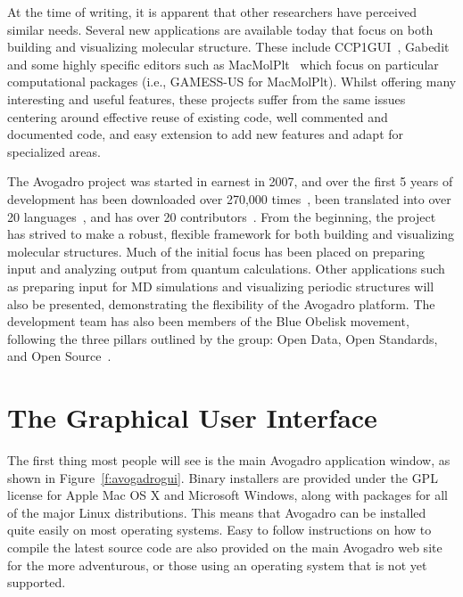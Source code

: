 \documentclass[10pt]{bmc_article}
\newenvironment{bmcformat}{\begin{raggedright}
\baselineskip20pt\sloppy\setboolean{publ}{false}}{\end{raggedright}
\baselineskip20pt\sloppy}
\begin{document}
\begin{bmcformat}
At the time of writing, it is apparent that other researchers have perceived
similar needs. Several new applications are available today that focus on both
building and visualizing molecular structure. These include
CCP1GUI~\cite{CCP1GUI}, Gabedit~\cite{Gabedit} and some highly specific
editors such as MacMolPlt~\cite{MacMolPlt} which focus on particular
computational packages (i.e., GAMESS-US for MacMolPlt). Whilst offering many
interesting and
useful features, these projects suffer from the same issues centering
around effective reuse of existing code, well commented and documented code, and
easy extension to add new features and adapt for specialized areas.

The Avogadro project was started in earnest in 2007, and over the
first 5 years of development has been downloaded over 270,000
times~\cite{Downloads}, been translated into over 20
languages~\cite{Translations}, and has over 20
contributors~\cite{OhlohContributors}. From the beginning, the project
has strived to make a robust, flexible framework for
both building and visualizing molecular structures. Much of the initial focus
has been placed on preparing input and analyzing output from quantum
calculations. Other applications such as preparing input for MD simulations and
visualizing periodic structures will also be presented, demonstrating the
flexibility of the Avogadro platform. The development team has also been
members of the Blue Obelisk movement, following the three pillars outlined by
the group: Open Data, Open Standards, and Open Source~\cite{BlueObelisk2006,
BlueObelisk2011}.

\section{The Graphical User Interface}

The first thing most people will see is the main Avogadro application
window, as shown in Figure~\ref{f:avogadrogui}.
Binary installers are provided under the GPL license for Apple Mac OS X and
Microsoft Windows, along with packages for all of the major Linux distributions.
This means that Avogadro can be installed quite easily on most operating
systems. Easy to follow instructions on how to compile the latest source code
are also provided on the main Avogadro web
site\cite{CompileWindows}\cite{CompileLinux} for the more adventurous,
or those using an operating system that is not yet supported.


\end{bmcformat}
\end{document}
